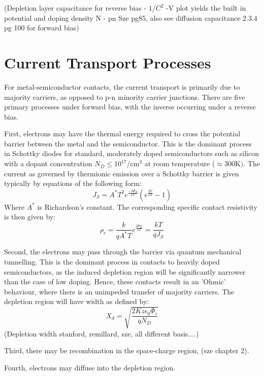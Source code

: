 (Depletion layer capacitance for reverse bias - $1/C^{2}$ -V plot yields the built in potential and doping density N - pn Sze pg85, also see diffusion capacitance 2.3.4 pg 100 for forward bias)

\section{Current Transport Processes}
\label{sec:current_transport_processes}
For metal-semiconductor contacts, the current transport is primarily due to majority carriers, as opposed to p-n minority carrier junctions. There are five primary processes under forward bias, with the inverse occurring under a reverse bias. 

First, electrons may have the thermal energy required to cross the potential barrier between the metal and the semiconductor. This is the dominant process in Schottky diodes for standard, moderately doped semiconductors such as silicon with a dopant concentration $N_{D}\leq10^{17}\si{\per\centi\metre\cubed}$ at room temperature ($\approx 300 \si{\kelvin})$. The current as governed by thermionic emission over a Schottky barrier is given typically by equations of the following form:
\begin{equation}
	J_{S} = A^{*}T^{2}e^{\frac{-2\Phi_{B}}{kT}}\left(e^{\frac{qV}{kT}} - 1\right)
\end{equation}
Where $A^{*}$ is Richardson's constant. The corresponding specific contact resistivity is then given by:
\begin{equation}
	\rho_{c}=\frac{k}{qA^{*}T}e^{\frac{2\Phi_{B}}{kT}}=\frac{kT}{qJ_{S}}
\end{equation}

Second, the electrons may pass through the barrier via quantum mechanical tunnelling. This is the dominant process in contacts to heavily doped semiconductors, as the induced depletion region will be significantly narrower than the case of low doping. Hence, these contacts result in an 'Ohmic' behaviour, where there is an unimpeded transfer of majority carriers. The depletion region will have width as defined by:
\begin{equation}
	X_{d} = \sqrt{\frac{2Kz\epsilon_{0}\Phi_{i}}{qN_{D}}}
\end{equation}
(Depletion width stanford, remillard, sze, all different basis....)

Third, there may be recombination in the space-charge region, (sze chapter 2).

Fourth, electrons may diffuse into the depletion region.

